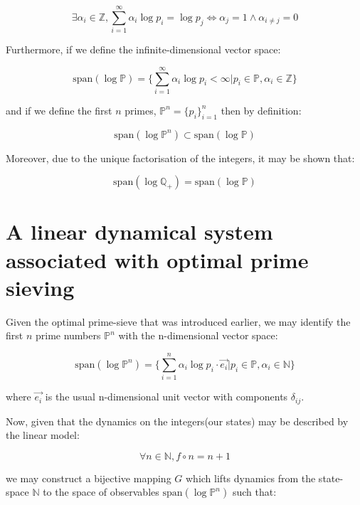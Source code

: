 \documentclass{article}
\begin{document}
\begin{equation}
\exists \alpha_i \in \mathbb{Z}, \sum_{i=1}^\infty \alpha_i \log p_i = \log p_j \iff \alpha_j = 1 \land \alpha_{i \neq j} = 0
\end{equation}

Furthermore, if we define the infinite-dimensional vector space:

\begin{equation}
\text{span}(\log \mathbb{P}) = \Big\{\sum_{i=1}^\infty \alpha_i \log p_i < \infty \lvert p_i \in \mathbb{P}, \alpha_i \in \mathbb{Z}\Big\}
\end{equation}

and if we define the first $n$ primes, $\mathbb{P}^n = \{p_i\}_{i=1}^n$ then by definition:

\begin{equation}
\text{span}(\log \mathbb{P}^n) \subset \text{span}(\log \mathbb{P})
\end{equation}

Moreover, due to the unique factorisation of the integers, it may be shown that:

\begin{equation}
\text{span}(\log \mathbb{Q}_+) = \text{span}(\log \mathbb{P})
\end{equation}

\section{A linear dynamical system associated with optimal prime sieving}

Given the optimal prime-sieve that was introduced earlier, we may identify the first $n$ prime numbers $\mathbb{P}^n$
with the n-dimensional vector space:

\begin{equation}
\text{span}(\log \mathbb{P}^n) = \Big\{\sum_{i=1}^n \alpha_i \log p_i \cdot \vec{e_i}  \lvert p_i \in \mathbb{P}, \alpha_i \in \mathbb{N}\Big\}
\end{equation}

where $\vec{e_i}$ is the usual n-dimensional unit vector with components $\delta_{ij}$.

Now, given that the dynamics on the integers(our states) may be described by the linear model:

\begin{equation}
\forall n \in \mathbb{N}, f \circ n = n+1
\end{equation}

we may construct a bijective mapping $G$ which lifts dynamics from the state-space $\mathbb{N}$ to the space of observables $\text{span}(\log \mathbb{P}^n)$ such that:
\end{document}
